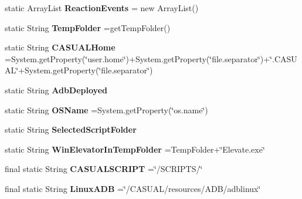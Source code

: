 \begin{DoxyCompactItemize}
\item 
\hypertarget{classCASUAL_1_1Statics_a08e52133ea61cbfa79ea917237defe06}{static Array\-List {\bfseries Reaction\-Events} = new Array\-List()}\label{classCASUAL_1_1Statics_a08e52133ea61cbfa79ea917237defe06}

\item 
\hypertarget{classCASUAL_1_1Statics_a1736d00afae27351f67801e14f3265c3}{static String {\bfseries Temp\-Folder} =get\-Temp\-Folder()}\label{classCASUAL_1_1Statics_a1736d00afae27351f67801e14f3265c3}

\item 
\hypertarget{classCASUAL_1_1Statics_acb4307ddfa6d362620758736a3fd25ac}{static String {\bfseries C\-A\-S\-U\-A\-L\-Home} =System.\-get\-Property(\char`\"{}user.\-home\char`\"{})+System.\-get\-Property(\char`\"{}file.\-separator\char`\"{})+\char`\"{}.C\-A\-S\-U\-A\-L\char`\"{}+System.\-get\-Property(\char`\"{}file.\-separator\char`\"{})}\label{classCASUAL_1_1Statics_acb4307ddfa6d362620758736a3fd25ac}

\item 
\hypertarget{classCASUAL_1_1Statics_a6e4f9e30c52d47de8103b16a6e2b1a67}{static String {\bfseries Adb\-Deployed}}\label{classCASUAL_1_1Statics_a6e4f9e30c52d47de8103b16a6e2b1a67}

\item 
\hypertarget{classCASUAL_1_1Statics_a566dc0821a5d546b6cd7f06a2d326ee1}{static String {\bfseries O\-S\-Name} =System.\-get\-Property(\char`\"{}os.\-name\char`\"{})}\label{classCASUAL_1_1Statics_a566dc0821a5d546b6cd7f06a2d326ee1}

\item 
\hypertarget{classCASUAL_1_1Statics_ad9f660971c1d5ca4a7b7f15978c75b8c}{static String {\bfseries Selected\-Script\-Folder}}\label{classCASUAL_1_1Statics_ad9f660971c1d5ca4a7b7f15978c75b8c}

\item 
\hypertarget{classCASUAL_1_1Statics_ad004fbb86b6a3d67a3e6afa8f6b4fd11}{static String {\bfseries Win\-Elevator\-In\-Temp\-Folder} =Temp\-Folder+\char`\"{}Elevate.\-exe\char`\"{}}\label{classCASUAL_1_1Statics_ad004fbb86b6a3d67a3e6afa8f6b4fd11}

\item 
\hypertarget{classCASUAL_1_1Statics_ae7da75cb80f615a007e1b9cdd056a0b5}{final static String {\bfseries C\-A\-S\-U\-A\-L\-S\-C\-R\-I\-P\-T} =\char`\"{}/S\-C\-R\-I\-P\-T\-S/\char`\"{}}\label{classCASUAL_1_1Statics_ae7da75cb80f615a007e1b9cdd056a0b5}

\item 
\hypertarget{classCASUAL_1_1Statics_ae9f619620b71abe3a4c9e5c5cbbf9c2b}{final static String {\bfseries Linux\-A\-D\-B} =\char`\"{}/C\-A\-S\-U\-A\-L/resources/A\-D\-B/adblinux\char`\"{}}\label{classCASUAL_1_1Statics_ae9f619620b71abe3a4c9e5c5cbbf9c2b}


\end{DoxyCompactItemize}
